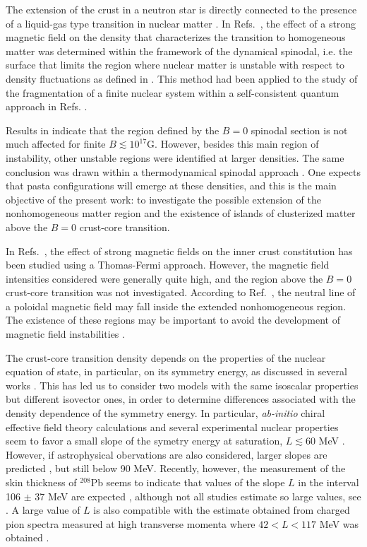 \documentclass[epj]{svjour}
\begin{document}
The extension of the crust in a neutron star is directly connected to
the presence of a liquid-gas type transition in nuclear matter
\cite{Mueller-95}.  In Refs.~\cite{Fang16,Fang17}, the effect of a strong
magnetic field on 
the density that characterizes the transition to
homogeneous matter  was determined within the framework of the  dynamical spinodal,
i.e. the surface that limits the region where nuclear matter is
unstable with respect to density fluctuations as defined in \cite{Providencia-06}.
This method had been applied to the study of the fragmentation of a finite
nuclear system
within a self-consistent quantum approach in Refs.
\cite{colonna02,chomaz04}.  

Results in \cite{Fang16,Fang17} indicate
that the region defined by the $B=0$   spinodal section is not much
affected for finite $B \lesssim 10^{17}$G. However, besides this main
region of instability, other  unstable regions were identified at
larger densities. The same conclusion was drawn within a
thermodynamical spinodal approach \cite{Chen17,Fang17a,Chatterjee2018}. One expects that pasta  configurations will emerge
at these densities, and this is the main
objective of the present work: to investigate the possible  extension
of the nonhomogeneous matter region
and the existence of islands
of clusterized matter above the $B=0$ crust-core transition. 

In Refs.~\cite{Lima-13,Bao21},  the effect
of strong magnetic fields on the inner crust constitution has been studied using a Thomas-Fermi
approach. However, the magnetic field intensities considered were
generally quite high,  and the region
above the $B=0$ crust-core transition was not investigated.  According
to Ref.~\cite{Sengo20}, the neutral line of a
poloidal magnetic field may fall inside the extended nonhomogeneous
region. The existence of these regions may
be important to  avoid the development of magnetic field
instabilities \cite{Lander2020}.


 The crust-core transition density depends on
the properties of the nuclear equation of state, in particular, on its
symmetry energy, as discussed in several works
\cite{Xu2009,Vidana2009,Ducoin2010,Ducoin2011,Newton2013,Pais2016Vlasov,Li2020}. This has led us to
consider two models with the same isoscalar properties but different
isovector ones, in order to determine differences associated
 with the density dependence of the symmetry energy. In particular,
 {\it  ab-initio}
 chiral effective field theory calculations and several experimental
 nuclear properties seem to favor a small slope of the symetry energy
 at saturation, $L \lesssim 60$ MeV \cite{Lattimer2013}. However, if astrophysical
 obervations are also considered, larger slopes are predicted
 \cite{Oertel2017}, but still below 90 MeV. Recently, however, the measurement of the skin
 thickness of $^{208}$Pb \cite{PREX2} seems to indicate that  values
 of the slope $L$ in the interval 106 $\pm$ 37 MeV are expected \cite{Reed2021}, although not all
 studies estimate so large values, see \cite{Yue2021,Essick2021}. A
 large value of $L$ is also compatible with the estimate
 obtained from  charged pion spectra measured at high transverse
 momenta where $42<L<117$ MeV was obtained \cite{Estee2021}.
\end{document}
